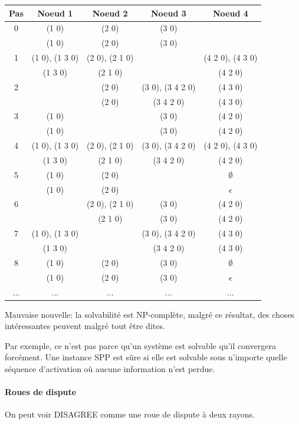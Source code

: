 \documentclass{article}
\begin{document}
\begin{sffamily}
\begin{tabular}{|c|c|c|c|c|}
  \hline
  Pas & Noeud 1 & Noeud 2 & Noeud 3 & Noeud 4 \\
  \hline
  0 & (1 0) & (2 0) & (3 0) & \\
  & (1 0) & (2 0) & (3 0) & \\
  \hline
  1 & (1 0), (1 3 0) & (2 0), (2 1 0) & & (4 2 0), (4 3 0) \\
  & (1 3 0) & (2 1 0) & & (4 2 0) \\
  \hline
  2 & & (2 0) & (3 0), (3 4 2 0) & (4 3 0) \\
  & & (2 0) & (3 4 2 0) & (4 3 0) \\
  \hline
  3 & (1 0) & & (3 0) & (4 2 0) \\
  & (1 0) & & (3 0) & (4 2 0) \\
  \hline
  4 & (1 0), (1 3 0) & (2 0), (2 1 0) & (3 0), (3 4 2 0) & (4 2 0), (4 3 0) \\
  & (1 3 0) & (2 1 0) & (3 4 2 0) & (4 2 0) \\
  \hline
  5 & (1 0) & (2 0) & & $\emptyset$ \\
  & (1 0) & (2 0) & & $\epsilon$ \\
  \hline
  6 & & (2 0), (2 1 0) & (3 0) & (4 2 0) \\
  & & (2 1 0) & (3 0) & (4 2 0) \\
  \hline
  7 & (1 0), (1 3 0) & & (3 0), (3 4 2 0) & (4 3 0) \\
  & (1 3 0) & & (3 4 2 0) & (4 3 0) \\
  \hline
  8 & (1 0) & (2 0) & (3 0) & $\emptyset$ \\
  & (1 0) & (2 0) & (3 0) & $\epsilon$ \\
  \hline
  ... & ... & ... & ... & ...
\end{tabular}

Mauvaise nouvelle: la solvabilité est NP-complète, malgré ce résultat,
des choses intéressantes peuvent malgré tout être dites.

Par exemple, ce n'est pas parce qu'un système est solvable qu'il
convergera forcément. Une instance SPP est sûre si elle est solvable
sous n'importe quelle séquence d'activation où aucune information
n'est perdue.

\paragraph{Roues de dispute}

On peut voir DISAGREE comme une roue de dispute à deux rayons.


\end{sffamily}
\end{document}
